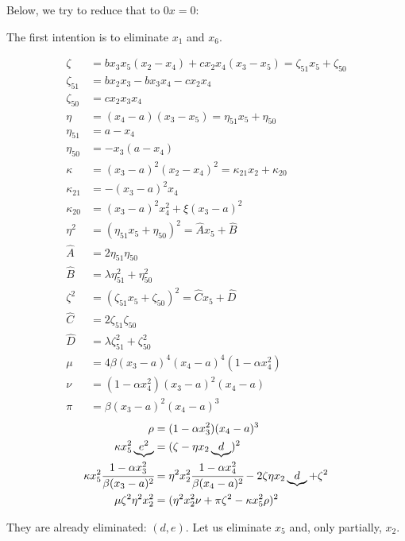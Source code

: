 \documentclass[12pt]{article}
\numberwithin{table}{section}
\begin{document}
Below, we try to reduce that to $0x = 0$:

The first intention is to eliminate $x_1$ and $x_6$.

\begin{align}
\zeta &= b x_3 x_5 (x_2 - x_4) + cx_2 x_4(x_3 - x_5) = \zeta_{51} x_5 + \zeta_{50} \\
\zeta_{51} &= bx_2x_3 - b x_3x_4 - cx_2 x_4 \\
\zeta_{50} &= cx_2 x_3 x_4 \\
\eta &= (x_4-a) (x_3 - x_5) = \eta_{51} x_5 + \eta_{50} \\
\eta_{51} &= a - x_4 \\
\eta_{50} &= -x_3 (a - x_4)\\
\kappa &= (x_3-a)^2 (x_2 - x_4)^2 =\kappa_{21} x_2 + \kappa_{20} \\
\kappa_{21} &= - (x_3-a)^2 x_4\\
\kappa_{20} &= (x_3-a)^2 x_4^2 + \xi (x_3-a)^2\\
\eta^2 &= (\eta_{51} x_5 + \eta_{50})^2 = \hat A x_5 + \hat B \\
\hat A &= 2\eta_{51}\eta_{50} \\
\hat B &= \lambda \eta_{51}^2 + \eta_{50}^2\\
\zeta^2 &= (\zeta_{51} x_5 + \zeta_{50})^2  = \hat C x_5 + \hat D\\
\hat C &= 2\zeta_{51}\zeta_{50} \\
\hat D &= \lambda \zeta_{51}^2 + \zeta_{50}^2 \\
\mu &= 4\beta (x_3 - a)^4 (x_4 - a)^4(1 - \alpha x_4^2 ) \\
\nu &= (1 - \alpha x_4^2)(x_3-a)^2(x_4-a)\\
\pi &= \beta (x_3-a)^2(x_4-a)^3
\end{align}
\begin{align}
\rho &= (1 - \alpha x_3^2 )(x_4-a)^3\\
\kappa x_5^2 \underbrace{e^2} &= (\zeta - \eta x_2 \underbrace{d})^2 \\ 
\kappa x_5^2 \cfrac{1 - \alpha x_3^2 }{\beta (x_3-a)^2} &= \eta^2 x_2^2 \cfrac{1 - \alpha x_4^2 }{\beta (x_4-a)^2} - 2 \zeta \eta x_2 \underbrace{d} + \zeta^2 \\
 \mu \zeta^2 \eta^2 x_2^2  &= (\eta^2 x_2^2 \nu  + \pi \zeta^2 - \kappa x_5^2 \rho)^2 
\end{align}

They are already eliminated: $(d,e)$. Let us eliminate $x_5$ and, only partially, $x_2$.
\end{document}
